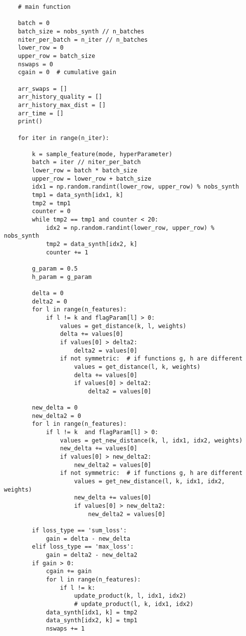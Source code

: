 \documentclass[oneside,10pt]{book}
\begin{document}
\begin{lstlisting}
    # main function

    batch = 0
    batch_size = nobs_synth // n_batches  
    niter_per_batch = n_iter // n_batches
    lower_row = 0
    upper_row = batch_size
    nswaps = 0
    cgain = 0  # cumulative gain

    arr_swaps = []
    arr_history_quality = []
    arr_history_max_dist = []
    arr_time = []
    print()

    for iter in range(n_iter): 

        k = sample_feature(mode, hyperParameter)    
        batch = iter // niter_per_batch
        lower_row = batch * batch_size
        upper_row = lower_row + batch_size 
        idx1 = np.random.randint(lower_row, upper_row) % nobs_synth
        tmp1 = data_synth[idx1, k]
        tmp2 = tmp1
        counter = 0
        while tmp2 == tmp1 and counter < 20:  
            idx2 = np.random.randint(lower_row, upper_row) % nobs_synth
            tmp2 = data_synth[idx2, k]
            counter += 1

        g_param = 0.5
        h_param = g_param

        delta = 0
        delta2 = 0
        for l in range(n_features):  
            if l != k and flagParam[l] > 0: 
                values = get_distance(k, l, weights)
                delta += values[0] 
                if values[0] > delta2:
                    delta2 = values[0]
                if not symmetric:  # if functions g, h are different
                    values = get_distance(l, k, weights)
                    delta += values[0] 
                    if values[0] > delta2:
                        delta2 = values[0]

        new_delta = 0
        new_delta2 = 0
        for l in range(n_features): 
            if l != k  and flagParam[l] > 0: 
                values = get_new_distance(k, l, idx1, idx2, weights)
                new_delta += values[0] 
                if values[0] > new_delta2:
                    new_delta2 = values[0]
                if not symmetric:  # if functions g, h are different
                    values = get_new_distance(l, k, idx1, idx2, weights)
                    new_delta += values[0]
                    if values[0] > new_delta2:
                        new_delta2 = values[0]

        if loss_type == 'sum_loss':
            gain = delta - new_delta
        elif loss_type == 'max_loss':
            gain = delta2 - new_delta2
        if gain > 0: 
            cgain += gain
            for l in range(n_features):
                if l != k:
                    update_product(k, l, idx1, idx2) 
                    # update_product(l, k, idx1, idx2) 
            data_synth[idx1, k] = tmp2
            data_synth[idx2, k] = tmp1
            nswaps += 1


\end{lstlisting}
\end{document}
